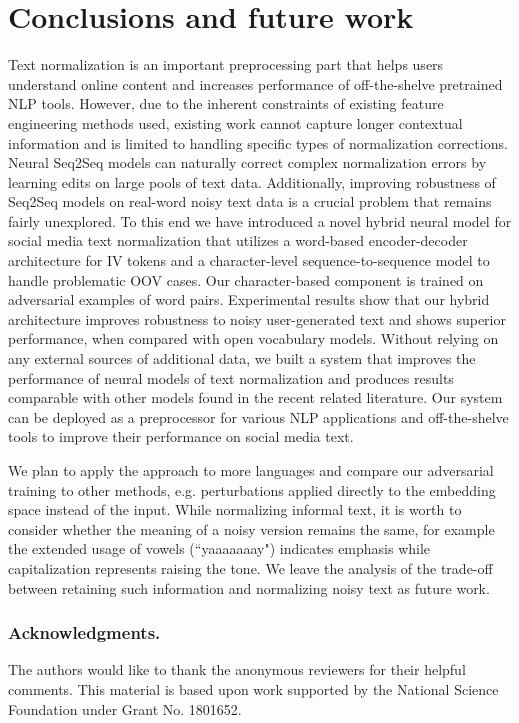 \documentclass[letterpaper]{article} \usepackage{aaai19}  \usepackage{times}  \usepackage{helvet} \usepackage{courier}  \usepackage[hyphens]{url}  \usepackage{graphicx} \urlstyle{rm} \def\UrlFont{\rm}  \usepackage{graphicx}  \frenchspacing  \setlength{\pdfpagewidth}{8.5in}  \setlength{\pdfpageheight}{11in}
\begin{document}
\section{Conclusions and future work}\label{sec:conclusion}
Text normalization is an important preprocessing part that helps users understand online content and increases performance of off-the-shelve pretrained NLP tools. However, due to the inherent constraints of existing feature engineering methods used, existing work cannot capture longer contextual information and is limited to handling specific types of normalization corrections. Neural Seq2Seq models can naturally correct complex normalization errors by learning edits on large pools of text data. Additionally, improving robustness of Seq2Seq models on real-word noisy text data is a crucial problem that remains fairly unexplored.  To this end we have introduced a novel hybrid neural model for social media text normalization that utilizes a word-based encoder-decoder architecture for IV tokens and a character-level sequence-to-sequence model to handle problematic OOV cases. Our character-based component is trained on adversarial examples of word pairs. Experimental results show that our hybrid architecture improves robustness to noisy user-generated text and shows superior performance, when compared with open vocabulary models. Without relying on any external sources of additional data, we built a system that improves the performance of neural models of text normalization and produces results comparable with other models found in the recent related literature. Our system can be deployed as a preprocessor for various NLP applications and off-the-shelve tools to improve their performance on social media text.  

We plan to apply the approach to more languages and compare our adversarial training to other methods, e.g. perturbations applied directly to the embedding space instead of the input. While normalizing informal text, it is worth to consider whether the meaning of a noisy version remains the same, for example the extended usage of vowels (``yaaaaaaay") indicates emphasis while capitalization represents raising the tone. We leave the analysis of the trade-off between retaining such information and normalizing noisy text as future work.   




\subsubsection{Acknowledgments.}
The authors would like to thank the anonymous reviewers for their helpful comments. This material is based upon work supported by the National Science Foundation under Grant No. 1801652.






\end{document}

